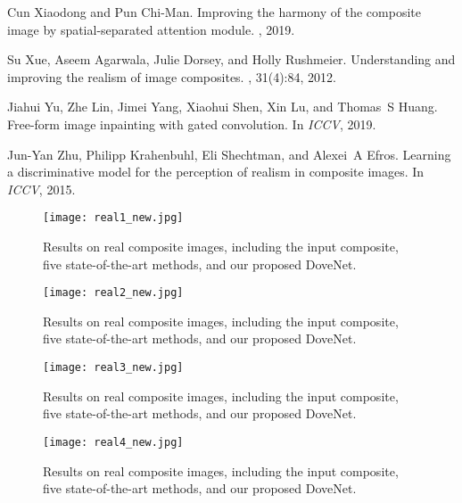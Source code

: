 \documentclass[10pt,twocolumn,letterpaper]{article}
\begin{document}
\begin{thebibliography}{10}
Cun Xiaodong and Pun Chi-Man.
\newblock Improving the harmony of the composite image by spatial-separated
  attention module.
, 2019.

Su Xue, Aseem Agarwala, Julie Dorsey, and Holly Rushmeier.
\newblock Understanding and improving the realism of image composites.
, 31(4):84, 2012.

Jiahui Yu, Zhe Lin, Jimei Yang, Xiaohui Shen, Xin Lu, and Thomas~S Huang.
\newblock Free-form image inpainting with gated convolution.
\newblock In {\em ICCV}, 2019.

Jun-Yan Zhu, Philipp Krahenbuhl, Eli Shechtman, and Alexei~A Efros.
\newblock Learning a discriminative model for the perception of realism in
  composite images.
\newblock In {\em ICCV}, 2015.

\end{thebibliography}


\begin{figure*}[tp!]
\begin{center}
\texttt{[image: real1\_new.jpg]}
\end{center}
   \caption{Results on real composite images, including the input composite, five state-of-the-art methods, and our proposed DoveNet.}
\label{fig:real1}
\end{figure*}

\begin{figure*}[tp!]
\begin{center}
\texttt{[image: real2\_new.jpg]}
\end{center}
   \caption{Results on real composite images, including the input composite, five state-of-the-art methods, and our proposed DoveNet. }
\label{fig:real2}
\end{figure*}

\begin{figure*}[tp!]
\begin{center}
\texttt{[image: real3\_new.jpg]}
\end{center}
   \caption{Results on real composite images, including the input composite, five state-of-the-art methods, and our proposed DoveNet. }
\label{fig:real3}
\end{figure*}

\begin{figure*}[tp!]
\begin{center}
\texttt{[image: real4\_new.jpg]}
\end{center}
   \caption{Results on real composite images, including the input composite, five state-of-the-art methods, and our proposed DoveNet. }
\label{fig:real4}
\end{figure*}
\end{document}
